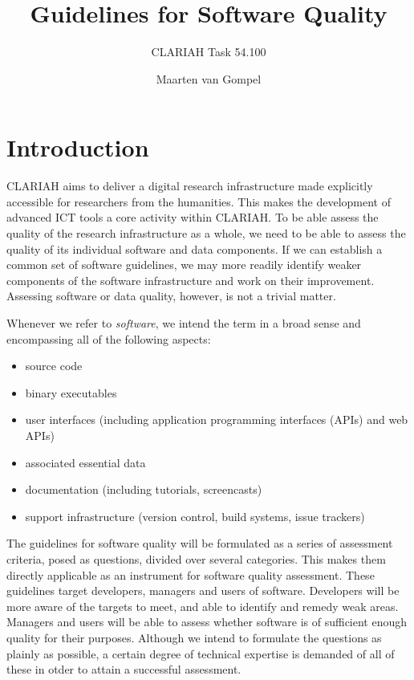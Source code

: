 \documentclass[a4paper,11pt]{article}
\begin{document}
\title{Guidelines for Software Quality}
\subtitle{CLARIAH Task 54.100} 

\author{Maarten van Gompel}

\maketitle

\section{Introduction}

CLARIAH aims to deliver a digital research infrastructure made explicitly
accessible for researchers from the humanities. This makes the development of advanced ICT
tools a core activity within CLARIAH. To be able assess the
quality of the research infrastructure as a whole, we need to be able to assess
the quality of its individual software and data components. If we can establish
a common set of software guidelines, we may more readily identify weaker
components of the software infrastructure and work on their improvement.
Assessing software or data quality, however, is not a trivial matter. 

Whenever we refer to \emph{software}, we intend the term in a broad sense and
encompassing all of the following aspects:
\begin{itemize}
    \item source code
    \item binary executables
    \item user interfaces (including application programming interfaces (APIs) and web APIs)
    \item associated essential data
    \item documentation (including tutorials, screencasts)
    \item support infrastructure (version control, build systems, issue trackers)
\end{itemize}

The guidelines for software quality will be formulated as a series of
assessment criteria, posed as questions, divided over several categories. This
makes them directly applicable as an instrument for software quality
assessment. These guidelines target developers, managers and users of software.
Developers will be more aware of the targets to meet, and able to identify and
remedy weak areas. Managers and users will be able to assess whether software is of
sufficient enough quality for their purposes. Although we intend to formulate
the questions as plainly as possible, a certain degree of technical
expertise is demanded of all of these in otder to attain a successful
assessment.
\end{document}
